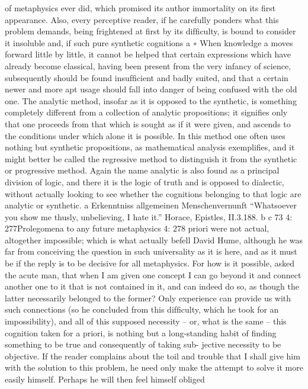 of metaphysics ever did, which promised its author immortality on its
ﬁrst appearance. Also, every perceptive reader, if he carefully ponders
what this problem demands, being frightened at ﬁrst by its difﬁculty, is
bound to consider it insoluble and, if such pure synthetic cognitions a
∗ When knowledge a moves forward little by little, it cannot be helped that certain
expressions which have already become classical, having been present from the
very infancy of science, subsequently should be found insufﬁcient and badly
suited, and that a certain newer and more apt usage should fall into danger of
being confused with the old one. The analytic method, insofar as it is opposed
to the synthetic, is something completely different from a collection of analytic
propositions; it signiﬁes only that one proceeds from that which is sought as if
it were given, and ascends to the conditions under which alone it is possible. In
this method one often uses nothing but synthetic propositions, as mathematical
analysis exempliﬁes, and it might better be called the regressive method to
distinguish it from the synthetic or progressive method. Again the name analytic
is also found as a principal division of logic, and there it is the logic of truth and
is opposed to dialectic, without actually looking to see whether the cognitions
belonging to that logic are analytic or synthetic.
a Erkenntniss
allgemeinen Menschenvernunft
“Whatsoever you show me thusly, unbelieving, I hate it.” Horace, Epistles, II.3.188.
b
c
73
4: 277Prolegomena to any future metaphysics
4: 278
priori were not actual, altogether impossible; which is what actually befell
David Hume, although he was far from conceiving the question in such
universality as it is here, and as it must be if the reply is to be decisive for
all metaphysics. For how is it possible, asked the acute man, that when
I am given one concept I can go beyond it and connect another one to
it that is not contained in it, and can indeed do so, as though the latter
necessarily belonged to the former? Only experience can provide us with
such connections (so he concluded from this difﬁculty, which he took
for an impossibility), and all of this supposed necessity – or, what is the
same – this cognition taken for a priori, is nothing but a long-standing
habit of ﬁnding something to be true and consequently of taking sub-
jective necessity to be objective.
If the reader complains about the toil and trouble that I shall give
him with the solution to this problem, he need only make the attempt
to solve it more easily himself. Perhaps he will then feel himself obliged
